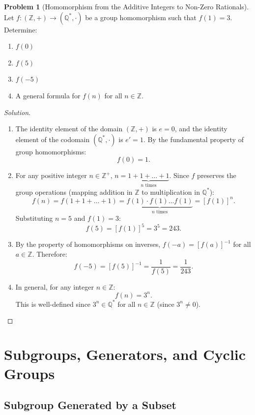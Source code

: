 \documentclass[12pt]{article}
\theoremstyle{definition}
\newtheorem{problem}[definition]{Problem}
\theoremstyle{plain}
\begin{document}
\begin{problem}[Homomorphism from the Additive Integers to Non-Zero Rationals]
Let $f: (\mathbb{Z}, +) \longrightarrow (\mathbb{Q}^*, \cdot)$ be a group homomorphism such that $f(1) = 3$.
Determine:
\begin{enumerate}[label=(\alph*)]
    \item $f(0)$
    \item $f(5)$
    \item $f(-5)$
    \item A general formula for $f(n)$ for all $n \in \mathbb{Z}$.
\end{enumerate}
\end{problem}
\begin{proof}[Solution]
\begin{enumerate}[label=(\alph*)]
    \item The identity element of the domain $(\mathbb{Z}, +)$ is $e = 0$, and the identity element of the codomain $(\mathbb{Q}^*, \cdot)$ is $e' = 1$. By the fundamental property of group homomorphisms:
    \[
    f(0) = 1.
    \]
    
    \item For any positive integer $n \in \mathbb{Z}^+$, $n = \underbrace{1 + 1 + \dots + 1}_{n \text{ times}}$. Since $f$ preserves the group operations (mapping addition in $\mathbb{Z}$ to multiplication in $\mathbb{Q}^*$):
    \[
    f(n) = f(1 + 1 + \dots + 1) = \underbrace{f(1) \cdot f(1) \dots f(1)}_{n \text{ times}} = [f(1)]^n.
    \]
    Substituting $n = 5$ and $f(1) = 3$:
    \[
    f(5) = [f(1)]^5 = 3^5 = 243.
    \]
    
    \item By the property of homomorphisms on inverses, $f(-a) = [f(a)]^{-1}$ for all $a \in \mathbb{Z}$. Therefore:
    \[
    f(-5) = [f(5)]^{-1} = \frac{1}{f(5)} = \frac{1}{243}.
    \]
    
    \item In general, for any integer $n \in \mathbb{Z}$:
    \[
    f(n) = 3^n.
    \]
    This is well-defined since $3^n \in \mathbb{Q}^*$ for all $n \in \mathbb{Z}$ (since $3^n \neq 0$).
\end{enumerate}
\end{proof}


\section{Subgroups, Generators, and Cyclic Groups}

\subsection{Subgroup Generated by a Subset}
\end{document}
